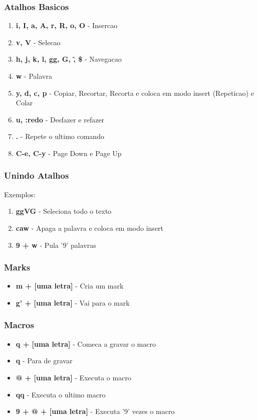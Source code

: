 \documentclass[aspectratio=169]{beamer}
\begin{document}
\begin{frame}\frametitle{Atalhos Basicos}
    \begin{enumerate}
        \item <1-> \textbf{i, I, a, A, r, R, o, O} - Insercao
        \item <2-> \textbf{v, V} - Selecao
        \item <3-> \textbf{h, j, k, l, gg, G, \^, \$} - Navegacao
        \item <4-> \textbf{w} - Palavra
        \item <5-> \textbf{y, d, c, p} - Copiar, Recortar, Recorta e coloca em modo insert (Repeticao) e Colar
        \item <6-> \textbf{u, :redo} - Desfazer e refazer
        \item <7-> \textbf{.} - Repete o ultimo comando
        \item <8-> \textbf{C-e, C-y} - Page Down e Page Up
    \end{enumerate}
\end{frame}

\begin{frame}\frametitle{Unindo Atalhos}
    Exemplos:
    \begin{enumerate}
        \item <1-> \textbf{ggVG} - Seleciona todo o texto
        \item <2-> \textbf{caw} - Apaga a palavra e coloca em modo insert
        \item <3-> \textbf{9 + w} - Pula '9' palavras
    \end{enumerate}
\end{frame}

\begin{frame}\frametitle{Marks}
    \begin{itemize}
        \item \textbf{m + [uma letra]} - Cria um mark
        \item \textbf{g' + [uma letra]} - Vai para o mark
    \end{itemize}
\end{frame}

\begin{frame}\frametitle{Macros}
    \begin{itemize}
        \item \textbf{q + [uma letra]} - Comeca a gravar o macro
        \item \textbf{q} - Para de gravar
        \item \textbf{@ + [uma letra]} - Executa o macro
        \item \textbf{qq} - Executa o ultimo macro
        \item \textbf{9 + @ + [uma letra]} - Executa '9' vezes o macro
    \end{itemize}
\end{frame}
\end{document}
